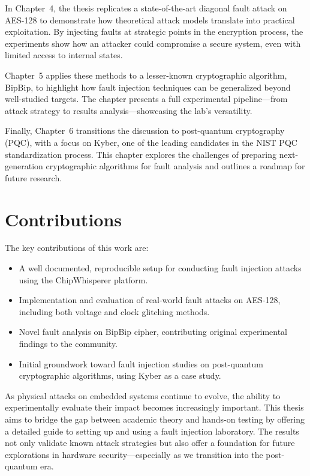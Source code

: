 In Chapter~4, the thesis replicates a state-of-the-art diagonal fault attack on AES-128 to demonstrate how theoretical attack models translate into practical exploitation. By injecting faults at strategic points in the encryption process, the experiments show how an attacker could compromise a secure system, even with limited access to internal states.

Chapter~5 applies these methods to a lesser-known cryptographic algorithm, BipBip, to highlight how fault injection techniques can be generalized beyond well-studied targets. The chapter presents a full experimental pipeline—from attack strategy to results analysis—showcasing the lab’s versatility.

Finally, Chapter~6 transitions the discussion to post-quantum cryptography (PQC), with a focus on Kyber, one of the leading candidates in the NIST PQC standardization process. This chapter explores the challenges of preparing next-generation cryptographic algorithms for fault analysis and outlines a roadmap for future research.

\section*{Contributions}

The key contributions of this work are:
\begin{itemize}
    \item A well documented, reproducible setup for conducting fault injection attacks using the ChipWhisperer platform.
    \item Implementation and evaluation of real-world fault attacks on AES-128, including both voltage and clock glitching methods.
    \item Novel fault analysis on BipBip cipher, contributing original experimental findings to the community.
    \item Initial groundwork toward fault injection studies on post-quantum cryptographic algorithms, using Kyber as a case study.
\end{itemize}


As physical attacks on embedded systems continue to evolve, the ability to experimentally evaluate their impact becomes increasingly important. This thesis aims to bridge the gap between academic theory and hands-on testing by offering a detailed guide to setting up and using a fault injection laboratory. The results not only validate known attack strategies but also offer a foundation for future explorations in hardware security—especially as we transition into the post-quantum era.


